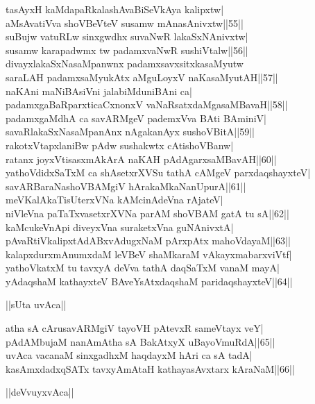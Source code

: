 \documentclass{article}
\begin{document}
tasAyxH kaMdapaRkalashAvaBiSeVkAya kalipxtw|\\
aMsAvatiVva shoVBeVteV susamw mAnasAnivxtw||55||\\
suBujw vatuRLw sinxgwdhx suvaNwR lakaSxNAnivxtw|\\
susamw karapadwmx tw padamxvaNwR sushiVtalw||56||\\
divayxlakaSxNasaMpanwnx padamxsavxsitxkasaMyutw\\
saraLAH padamxsaMyukAtx aMguLoyxV naKasaMyutAH||57||\\
naKAni maNiBAsiVni jalabiMduniBAni ca|\\
padamxgaBaRparxticaCxnonxV vaNaRsatxdaMgasaMBavaH||58||\\
padamxgaMdhA ca savARMgeV pademxVva BAti BAminiV|\\
savaRlakaSxNasaMpanAnx nAgakanAyx sushoVBitA||59||\\
rakotxVtapxlaniBw pAdw sushakwtx cAtishoVBanw|\\
ratanx joyxVtisasxmAkArA naKAH pAdAgarxsaMBavAH||60||\\
yathoVdidxSaTxM ca shAsetxrXVSu tathA cAMgeV parxdaqshayxteV|\\
savARBaraNashoVBAMgiV hArakaMkaNanUpurA||61||\\
meVKalAkaTisUterxVNa kAMcinAdeVna rAjateV|\\
niVleVna paTaTxvasetxrXVNa parAM shoVBAM gatA tu sA||62||\\
kaMcukeVnApi diveyxVna suraketxVna guNAnivxtA|\\
pAvaRtiVkalipxtAdABxvAdugxNaM pArxpAtx mahoVdayaM||63||\\
kalapxdurxmAnumxdaM leVBeV shaMkaraM vAkayxmabarxviVtf|\\
yathoVkatxM tu tavxyA deVva tathA daqSaTxM vanaM mayA|\\
yAdaqshaM kathayxteV BAveYsAtxdaqshaM paridaqshayxteV||64||\\

\begin{center}
||sUta uvAca||
\end{center}

atha sA cArusavARMgiV tayoVH pAtevxR sameVtayx veY|\\
pAdAMbujaM nanAmAtha sA BakAtxyX uBayoVmuRdA||65||\\
uvAca vacanaM sinxgadhxM haqdayxM hAri ca sA tadA|\\
kasAmxdadxqSATx tavxyAmAtaH kathayasAvxtarx kAraNaM||66||\\

\begin{center}
||deVvuyxvAca||
\end{center}
\end{document}
